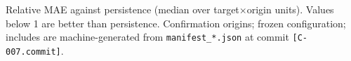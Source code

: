 %
%      
%
%

\begin{table}[htbp]
    \centering
    
    \caption{Relative MAE against persistence (median over target$\times$origin
    units). Values below 1 are better than persistence. Confirmation origins;
    frozen configuration; includes are machine-generated from
    \texttt{manifest\_*.json} at commit \texttt{[C-007.commit]}.}
    \label{tab:stocks_relmae}
\end{table}
